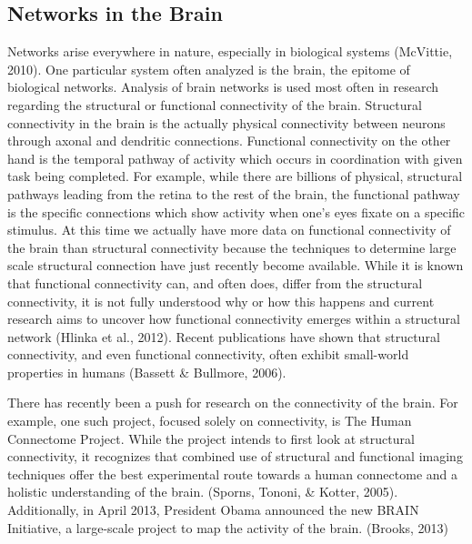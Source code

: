 \documentclass[11pt,letterpaper,doublespacing,titlepage]{article}
\begin{document}
\subsection{Networks in the Brain}
\par
Networks arise everywhere in nature, especially in biological systems (McVittie, 2010). One particular system often analyzed is the brain, the epitome of biological networks. Analysis of brain networks is used most often in research regarding the structural or functional connectivity of the brain. Structural connectivity in the brain is the actually physical connectivity between neurons through axonal and dendritic connections. Functional connectivity on the other hand is the temporal pathway of activity which occurs in coordination with given task being completed. For example, while there are billions of physical, structural pathways leading from the retina to the rest of the brain, the functional pathway is the specific connections which show activity when one's eyes fixate on a specific stimulus. At this time we actually have more data on functional connectivity of the brain than structural connectivity because the techniques to determine large scale structural connection have just recently become available. While it is known that functional connectivity can, and often does, differ from the structural connectivity, it is not fully understood why or how this happens and current research aims to uncover how functional connectivity emerges within a structural network (Hlinka et al., 2012). Recent publications have shown that structural connectivity, and even functional connectivity, often exhibit small-world properties in humans (Bassett \& Bullmore, 2006).
\par
There has recently been a push for research on the connectivity of the brain. For example, one such project, focused solely on connectivity, is The Human Connectome Project. While the project intends to first look at structural connectivity, it recognizes that combined use of structural and functional imaging techniques offer the best experimental route towards a human connectome and a holistic understanding of the brain. (Sporns, Tononi, \& Kotter, 2005). Additionally, in April 2013, President Obama announced the new BRAIN Initiative, a large-scale project to map the activity of the brain. (Brooks, 2013)
\end{document}
